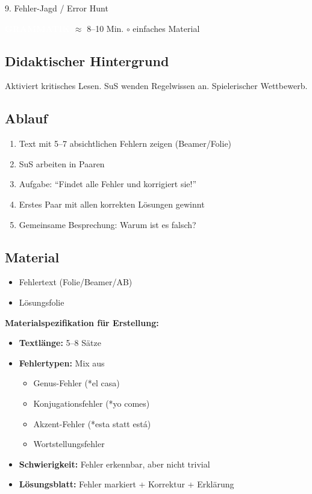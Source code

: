 \documentclass[11pt, a4paper]{article}
\newcommand{\tagGrammatik}{\colorbox{grammatik}{\textcolor{white}{\footnotesize\textbf{GRAMMATIK}}}}
\newcommand{\zeit}[1]{\textcolor{grau}{\footnotesize $\approx$ #1 Min.}}
\newcommand{\matEinfach}{\textcolor{warnung}{$\circ$ einfaches Material}}
\begin{document}
\begin{methode}{9. Fehler-Jagd / Error Hunt}

\tagGrammatik{} \zeit{8--10} \hfill \matEinfach

\subsection*{Didaktischer Hintergrund}
Aktiviert kritisches Lesen. SuS wenden Regelwissen an. Spielerischer Wettbewerb.

\subsection*{Ablauf}
\begin{enumerate}[leftmargin=*]
    \item Text mit 5--7 absichtlichen Fehlern zeigen (Beamer/Folie)
    \item SuS arbeiten in Paaren
    \item Aufgabe: ``Findet alle Fehler und korrigiert sie!''
    \item Erstes Paar mit allen korrekten Lösungen gewinnt
    \item Gemeinsame Besprechung: Warum ist es falsch?
\end{enumerate}

\subsection*{Material}
\begin{materialbox}
\begin{itemize}[label=$\square$, leftmargin=*]
    \item Fehlertext (Folie/Beamer/AB)
    \item Lösungsfolie
\end{itemize}

\textbf{Materialspezifikation für Erstellung:}
\begin{itemize}[leftmargin=*]
    \item \textbf{Textlänge:} 5--8 Sätze
    \item \textbf{Fehlertypen:} Mix aus
    \begin{itemize}
        \item Genus-Fehler (*el casa)
        \item Konjugationsfehler (*yo comes)
        \item Akzent-Fehler (*esta statt está)
        \item Wortstellungsfehler
    \end{itemize}
    \item \textbf{Schwierigkeit:} Fehler erkennbar, aber nicht trivial
    \item \textbf{Lösungsblatt:} Fehler markiert + Korrektur + Erklärung
\end{itemize}
\end{materialbox}

\end{methode}
\end{document}
